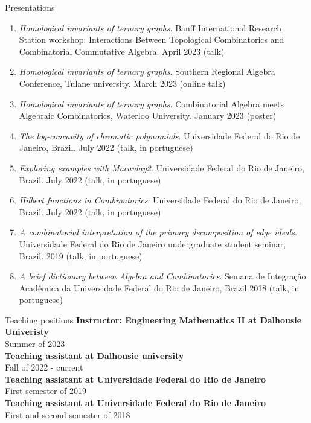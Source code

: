 \documentclass[12pt]{resume} %
\begin{document}
\begin{rSection}{Presentations}
\begin{enumerate}
        \item \textit{Homological invariants of ternary graphs}. Banff International Research Station workshop: Interactions Between Topological Combinatorics and Combinatorial Commutative Algebra. April 2023 (talk)
        \item \textit{Homological invariants of ternary graphs}. Southern Regional Algebra Conference, Tulane university. March 2023 (online talk)
        \item \textit{Homological invariants of ternary graphs}. Combinatorial Algebra meets Algebraic Combinatorics, Waterloo University. January 2023 (poster)
        \item \textit{The log-concavity of chromatic polynomials}. Universidade Federal do Rio de Janeiro, Brazil. July 2022 (talk, in portuguese)
        \item \textit{Exploring examples with Macaulay2}. Universidade Federal do Rio de Janeiro, Brazil. July 2022 (talk, in portuguese)
        \item \textit{Hilbert functions in Combinatorics}. Universidade Federal do Rio de Janeiro, Brazil. July 2022 (talk, in portuguese)
        \item \textit{A combinatorial interpretation of the primary decomposition of edge ideals}. Universidade Federal do Rio de Janeiro undergraduate student seminar, Brazil. 2019 (talk, in portuguese)
        \item \textit{A brief dictionary between Algebra and Combinatorics}. Semana de Integração Acadêmica da Universidade Federal do Rio de Janeiro, Brazil 2018 (talk, in portuguese)
    \end{enumerate}
\end{rSection}


\begin{rSection}{Teaching positions}
    {\bf Instructor: Engineering Mathematics II at Dalhousie Univeristy}
    \\
    Summer of 2023
    \\
    {\bf Teaching assistant at Dalhousie university}
    \\
    Fall of 2022 - current
    \\
    {\bf Teaching assistant at Universidade Federal do Rio de Janeiro} 
    \\
    First semester of 2019
    \\
    {\bf Teaching assistant at Universidade Federal do Rio de Janeiro} 
    \\
    First and second semester of 2018
    \\
        
\end{rSection}
\end{document}
